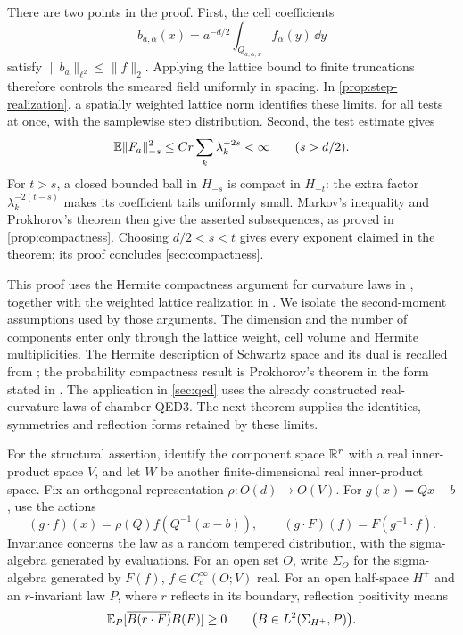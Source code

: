 There are two points in the proof. First, the cell coefficients
\begin{equation}\label{eq:cell-coefficients}
 b_{a,\alpha}(x)=a^{-d/2}\int_{Q_{a,\alpha,x}}f_\alpha(y)\,\dd y
\end{equation}
satisfy $\|b_a\|_{\ell^2}\le\|f\|_2$. Applying the lattice
bound to finite truncations therefore controls the smeared field
uniformly in spacing. In \cref{prop:step-realization}, a spatially
weighted lattice norm identifies these limits, for all tests at
once, with the samplewise step distribution. Second, the test estimate gives
\[
 \mathbb E\|F_a\|_{-s}^2\le Cr\sum_k\lambda_k^{-2s}<\infty
 \qquad(s>d/2).
\]
For $t>s$, a closed bounded ball in $H_{-s}$ is compact in $H_{-t}$:
the extra factor $\lambda_k^{-2(t-s)}$ makes its coefficient tails
uniformly small. Markov's inequality and Prokhorov's theorem then
give the asserted subsequences, as proved in \cref{prop:compactness}.
Choosing $d/2<s<t$ gives every exponent claimed in the theorem;
its proof concludes \cref{sec:compactness}.

This proof uses the Hermite compactness argument for curvature laws
in \cite[Sections~5.4 and~6.2]{QED3Manuscript}, together with the
weighted lattice realization in
\cite[Sections~5.3 and~6.1]{LatticeLimits}. We isolate the
second-moment assumptions used by those arguments. The dimension
and the number of components enter only through the lattice weight,
cell volume and Hermite multiplicities. The Hermite description of
Schwartz space and its dual is recalled from
\cite[Sections~2, 4 and~5]{RadhaThangavelu}; the probability compactness
result is Prokhorov's theorem in the form stated in
\cite[Theorem~1.1]{Sorensen}. The application in \cref{sec:qed}
uses the already constructed real-curvature laws of chamber QED3.
The next theorem supplies the identities, symmetries and reflection
forms retained by these limits.

For the structural assertion, identify the component space $\mathbb R^r$ with a real inner-product space \(V\), and let \(W\) be another
finite-dimensional real inner-product space.
Fix an orthogonal representation \(\rho:O(d)\to O(V)\).
For \(g(x)=Qx+b\), use the actions
\begin{equation}\label{eq:geometric-action}
 (g\cdot f)(x)=\rho(Q)f(Q^{-1}(x-b)),\qquad
 (g\cdot F)(f)=F(g^{-1}\cdot f).
\end{equation}
Invariance concerns the law as a random tempered distribution,
with the sigma-algebra generated by evaluations.
For an open set \(O\), write \(\Sigma_O\) for the sigma-algebra
generated by \(F(f)\), \(f\in C_c^\infty(O;V)\) real.
For an open half-space \(H^+\) and an \(r\)-invariant law \(P\),
where \(r\) reflects in its
boundary, reflection positivity means
\[
 \mathbb E_P[\overline{B(r\cdot F)}B(F)]\ge0
 \qquad\bigl(B\in L^2(\Sigma_{H^+},P)\bigr).
\]

